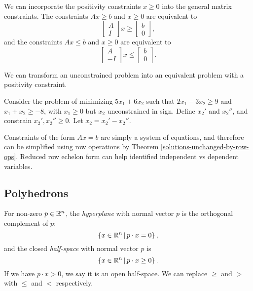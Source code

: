 \begin{prop}
    We can incorporate the positivity constraints $x \geq 0$ into the general matrix constraints. The constraints $Ax \geq b$ and $x \geq 0$ are equivalent to \[\begin{bmatrix} A \\ I\end{bmatrix}x \geq \begin{bmatrix} b \\ 0 \end{bmatrix},\]
    and the constraints $Ax \leq b$ and $x \geq 0$ are equivalent to \[\begin{bmatrix} A \\ -I\end{bmatrix}x \leq \begin{bmatrix} b \\ 0 \end{bmatrix}.\]
\end{prop}

\begin{prop}
    We can transform an unconstrained problem into an equivalent problem with a positivity constraint.
\end{prop}

\begin{exmp}
    Consider the problem of minimizing $5x_1 + 6x_2$ such that $2x_1 - 3x_2 \geq 9$ and $x_1 + x_2 \geq -8$, with $x_1 \geq 0$ but $x_2$ unconstrained in sign. Define $x_2'$ and $x_2''$, and constrain $x_2', x_2'' \geq 0$. Let $x_2 = x_2' - x_2''$.
\end{exmp}

\begin{rmk}
    Constraints of the form $Ax = b$ are simply a system of equations, and therefore can be simplified using row operations by Theorem \ref{solutions-unchanged-by-row-ops}. Reduced row echelon form can help identified independent vs dependent variables.
\end{rmk}

\subsection{Polyhedrons}

\begin{defn}
    For non-zero $p \in \mathbb{R}^n$, the \emph{hyperplane} with normal vector $p$ is the orthogonal complement of $p$: \[\left\{x \in \mathbb{R}^n \,\middle|\, p \cdot x = 0 \right\},\]
    and the closed \emph{half-space} with normal vector $p$ is
    \[\left\{x \in \mathbb{R}^n \,\middle|\, p \cdot x \geq 0 \right\}.\]
    If we have $p \cdot x > 0$, we say it is an open half-space. We can replace $\geq$ and $>$ with $\leq$ and $<$ respectively.
\end{defn}

